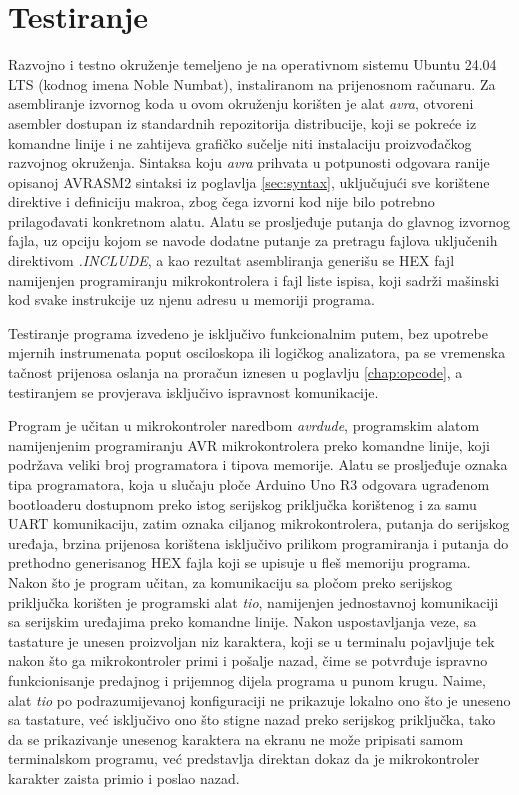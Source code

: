 \section{Testiranje}
\label{sec:testing}
%
Razvojno i testno okruženje temeljeno je na operativnom sistemu
\foreignlanguage{english}{Ubuntu 24.04 LTS} (kodnog imena
\foreignlanguage{english}{Noble Numbat}), instaliranom na prijenosnom
računaru. Za asembliranje izvornog koda u ovom okruženju korišten je
alat \emph{avra}, otvoreni asembler dostupan iz standardnih repozitorija
distribucije, koji se pokreće iz komandne linije i ne zahtijeva grafičko
sučelje niti instalaciju proizvođačkog razvojnog okruženja. Sintaksa
koju \emph{avra} prihvata u potpunosti odgovara ranije opisanoj
\foreignlanguage{english}{AVRASM2} sintaksi iz poglavlja
\ref{sec:syntax}, uključujući sve korištene direktive i definiciju
makroa, zbog čega izvorni kod nije bilo potrebno prilagođavati
konkretnom alatu. Alatu se prosljeđuje putanja do glavnog izvornog
fajla, uz opciju kojom se navode dodatne putanje za pretragu fajlova
uključenih direktivom \emph{.INCLUDE}, a kao rezultat asembliranja
generišu se \foreignlanguage{english}{HEX} fajl namijenjen programiranju
mikrokontrolera i fajl liste ispisa, koji sadrži mašinski kod svake
instrukcije uz njenu adresu u memoriji programa.

Testiranje programa izvedeno je isključivo funkcionalnim putem, bez
upotrebe mjernih instrumenata poput osciloskopa ili logičkog analizatora,
pa se vremenska tačnost prijenosa oslanja na proračun iznesen u poglavlju
\ref{chap:opcode}, a testiranjem se provjerava isključivo ispravnost
komunikacije.

Program je učitan u mikrokontroler naredbom \emph{avrdude}, programskim
alatom namijenjenim programiranju \foreignlanguage{english}{AVR}
mikrokontrolera preko komandne linije, koji podržava veliki broj
programatora i tipova memorije. Alatu se prosljeđuje oznaka tipa
programatora, koja u slučaju ploče Arduino Uno R3 odgovara ugrađenom
bootloaderu dostupnom preko istog serijskog priključka korištenog i za
samu \foreignlanguage{english}{UART} komunikaciju, zatim oznaka
ciljanog mikrokontrolera, putanja do serijskog uređaja, brzina
prijenosa korištena isključivo prilikom programiranja i putanja do
prethodno generisanog \foreignlanguage{english}{HEX} fajla koji se
upisuje u fleš memoriju programa. Nakon što je program učitan, za
komunikaciju sa pločom preko serijskog priključka korišten je programski
alat \emph{tio}, namijenjen jednostavnoj komunikaciji sa serijskim uređajima
preko komandne linije. Nakon uspostavljanja veze, sa tastature je unesen
proizvoljan niz karaktera, koji se u terminalu pojavljuje tek nakon što
ga mikrokontroler primi i pošalje nazad, čime se potvrđuje ispravno
funkcionisanje predajnog i prijemnog dijela programa u punom krugu.
Naime, alat \emph{tio} po podrazumijevanoj konfiguraciji ne prikazuje
lokalno ono što je uneseno sa tastature, već isključivo ono što stigne
nazad preko serijskog priključka, tako da se prikazivanje unesenog
karaktera na ekranu ne može pripisati samom terminalskom programu, već
predstavlja direktan dokaz da je mikrokontroler karakter zaista primio i
poslao nazad.

